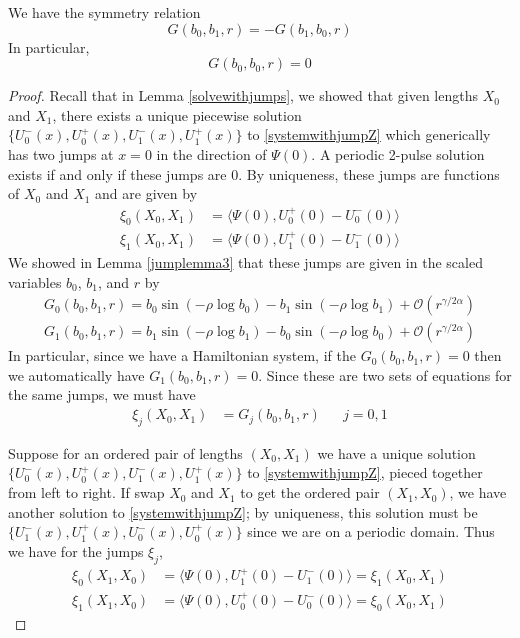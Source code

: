 \documentclass[thesis.tex]{subfiles}
\begin{document}
\begin{lemma}\label{Gsymm}
We have the symmetry relation
\begin{equation}
G(b_0, b_1, r) = -G(b_1, b_0, r)
\end{equation}
In particular, 
\[
G(b_0, b_0, r) = 0
\]
\begin{proof}
Recall that in Lemma \ref{solvewithjumps}, we showed that given lengths $X_0$ and $X_1$, there exists a unique piecewise solution $\{ U_0^-(x), U_0^+(x), U_1^-(x), U_1^+(x) \}$ to \eqref{systemwithjumpZ} which generically has two jumps at $x = 0$ in the direction of $\Psi(0)$. A periodic 2-pulse solution exists if and only if these jumps are 0. By uniqueness, these jumps are functions of $X_0$ and $X_1$ and are given by
\begin{equation}\label{xijumps}
\begin{aligned}
\xi_0(X_0, X_1) &= \langle \Psi(0), U_0^+(0) - U_0^-(0) \rangle  \\
\xi_1(X_0, X_1) &= \langle \Psi(0), U_1^+(0) - U_1^-(0) \rangle 
\end{aligned}
\end{equation}
We showed in Lemma \ref{jumplemma3} that these jumps are given in the scaled variables $b_0$, $b_1$, and $r$ by
\begin{equation}\label{G0G1}
\begin{aligned}
G_0(b_0, b_1, r) = b_0 \sin \left( -\rho \log b_0 \right) - b_1 \sin \left( -\rho \log b_1 \right) + \mathcal{O}(r^{\gamma / 2 \alpha}) \\
G_1(b_0, b_1, r) = b_1 \sin \left( -\rho \log b_1 \right) - b_0 \sin \left( -\rho \log b_0 \right) + \mathcal{O}(r^{\gamma / 2 \alpha}) 
\end{aligned}
\end{equation}
In particular, since we have a Hamiltonian system, if the $G_0(b_0, b_1, r) = 0$ then we automatically have $G_1(b_0, b_1, r) = 0$. Since these are two sets of equations for the same jumps, we must have 
\begin{align}\label{xiGequiv}
\xi_j(X_0, X_1) &= G_j(b_0, b_1, r) && j = 0, 1
\end{align} 

Suppose for an ordered pair of lengths $(X_0, X_1)$ we have a unique solution $\{ U_0^-(x), U_0^+(x), U_1^-(x), U_1^+(x) \}$ to \eqref{systemwithjumpZ}, pieced together from left to right. If swap $X_0$ and $X_1$ to get the ordered pair $(X_1, X_0)$, we have another solution to \eqref{systemwithjumpZ}; by uniqueness, this solution must be $\{ U_1^-(x), U_1^+(x), U_0^-(x), U_0^+(x)\}$ since we are on a periodic domain. Thus we have for the jumps $\xi_j$,
\begin{equation}\label{xiswapX}
\begin{aligned}
\xi_0(X_1, X_0) &= \langle \Psi(0), U_1^+(0) - U_1^-(0) \rangle = \xi_1(X_0, X_1) \\
\xi_1(X_1, X_0) &= \langle \Psi(0), U_0^+(0) - U_0^-(0) \rangle = \xi_0(X_0, X_1)
\end{aligned}
\end{equation}


\end{proof}
\end{lemma}
\end{document}
